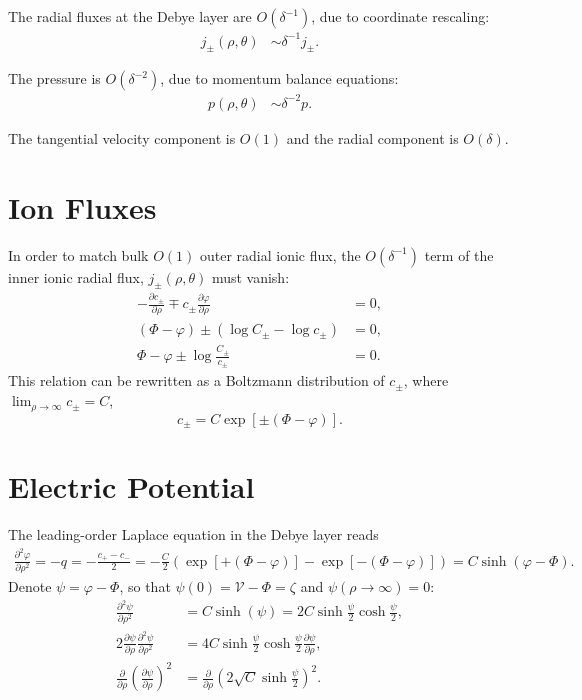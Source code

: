 \documentclass[MSc,beforeExam]{iitcsthesis}
\newcommand{\deriv}[2]{\frac{\partial #1}{\partial #2}}
\newcommand{\pars}[1]{\left(#1\right)}
\newcommand\cV{\mathscr{V}}
\begin{document}
The radial fluxes at the Debye layer are $O(\delta^{-1})$, due to coordinate rescaling:
\begin{align}
  j_\pm(\rho, \theta) &\sim \delta^{-1} j_\pm.
\end{align}

The pressure is $O(\delta^{-2})$, due to momentum balance equations:
\begin{align}
  p(\rho, \theta) &\sim \delta^{-2} p.
\end{align}

The tangential velocity component is $O(1)$ and the radial component is $O(\delta)$.

\section{Ion Fluxes}

In order to match bulk $O(1)$ outer radial ionic flux, 
the $O(\delta^{-1})$ term of the inner ionic radial flux, $j_\pm(\rho, \theta)$ must vanish:
\begin{align}
 \nonumber
  -\deriv{c_\pm}{\rho} \mp c_\pm \deriv{\varphi}{\rho} &= 0, \\
  \pars{\varPhi - \varphi} \pm\pars{\log C_\pm - \log c_\pm} &= 0, \\
 \nonumber
  \varPhi - \varphi \pm \log \frac{C_\pm}{c_\pm} &= 0.
\end{align}
This relation can be rewritten as a Boltzmann distribution of $c_\pm$,
where $\lim_{\rho\rightarrow\infty} c_\pm = C$,
\begin{equation}
c_\pm = C \exp\left[\pm(\varPhi - \varphi)\right].
\end{equation}

\section{Electric Potential}
The leading-order Laplace equation in the Debye layer reads
\begin{align}  
\deriv{^2 \varphi}{\rho^2} = -q = -\frac{c_+ - c_-}{2} = 
-\frac{C}{2} \pars{\exp\left[+(\varPhi - \varphi)\right] - \exp\left[-(\varPhi - \varphi)\right]} = C \sinh(\varphi - \varPhi).
\end{align}
Denote $\psi = \varphi - \varPhi$, so that $\psi(0) = \cV - \varPhi = \zeta$ and 
$\psi(\rho\rightarrow\infty) = 0$:
\begin{align}
\nonumber
\deriv{^2 \psi}{\rho^2} &= C \sinh(\psi) = 2 C \sinh{\frac{\psi}{2}}\cosh{\frac{\psi}{2}} ,
\\
2\deriv{\psi}{\rho} \deriv{^2 \psi}{\rho^2} &= 
4 C \sinh{\frac{\psi}{2}}\cosh{\frac{\psi}{2}} \deriv{\psi}{\rho} ,
\\ \nonumber
\deriv{}{\rho} \pars{\deriv{\psi}{\rho}}^2 &= 
\deriv{}{\rho} \pars{2 \sqrt{C} \sinh{\frac{\psi}{2}}}^2 .
\end{align}  
\end{document}
